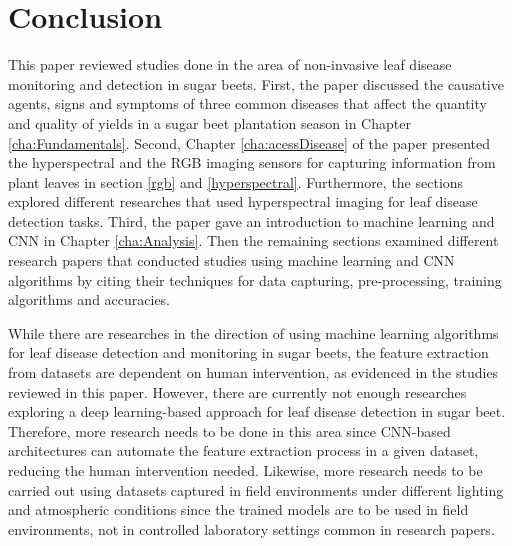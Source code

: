 \chapter{Conclusion}\label{cha:conclusion}
This paper reviewed studies done in the area of non-invasive leaf disease monitoring and detection in sugar beets. First, the paper discussed the causative agents, signs and symptoms of three common diseases that affect the quantity and quality of yields in a sugar beet plantation season in Chapter \ref{cha:Fundamentals}. Second, Chapter \ref{cha:acessDisease} of the paper presented the hyperspectral and the RGB imaging sensors for capturing information from plant leaves in section \ref{rgb} and \ref{hyperspectral}. Furthermore, the sections explored different researches that used hyperspectral imaging for leaf disease detection tasks. Third, the paper gave an introduction to machine learning and CNN in Chapter \ref{cha:Analysis}. Then the remaining sections examined different research papers that conducted studies using machine learning and CNN algorithms by citing their techniques for data capturing, pre-processing, training algorithms and accuracies.

While there are researches in the direction of using machine learning algorithms for leaf disease detection and monitoring in sugar beets, the feature extraction from datasets are dependent on human intervention, as evidenced in the studies reviewed in this paper. However, there are currently not enough researches exploring a deep learning-based approach for leaf disease detection in sugar beet. Therefore, more research needs to be done in this area since CNN-based architectures can automate the feature extraction process in a given dataset, reducing the human intervention needed. Likewise, more research needs to be carried out using datasets captured in field environments under different lighting and atmospheric conditions since the trained models are to be used in field environments, not in controlled laboratory settings common in research papers.

